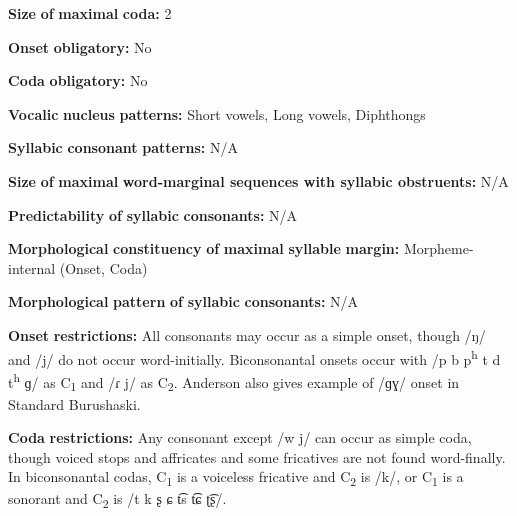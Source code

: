 \documentclass[output=paper]{langsci/langscibook}
\begin{document}
\begin{styleBody}
\textbf{Size} \textbf{of} \textbf{maximal} \textbf{coda:} 2
\end{styleBody}

\begin{styleBody}
\textbf{Onset} \textbf{obligatory:} No
\end{styleBody}

\begin{styleBody}
\textbf{Coda} \textbf{obligatory:} No
\end{styleBody}

\begin{styleBody}
\textbf{Vocalic} \textbf{nucleus} \textbf{patterns:} Short vowels, Long vowels, Diphthongs
\end{styleBody}

\begin{styleBody}
\textbf{Syllabic} \textbf{consonant} \textbf{patterns:} N/A
\end{styleBody}

\begin{styleBody}
\textbf{Size} \textbf{of} \textbf{maximal} \textbf{word{}-marginal sequences with syllabic obstruents:} N/A
\end{styleBody}

\begin{styleBody}
\textbf{Predictability} \textbf{of} \textbf{syllabic} \textbf{consonants:} N/A
\end{styleBody}

\begin{styleBody}
\textbf{Morphological} \textbf{constituency} \textbf{of} \textbf{maximal} \textbf{syllable} \textbf{margin:} Morpheme-internal (Onset, Coda)
\end{styleBody}

\begin{styleBody}
\textbf{Morphological} \textbf{pattern} \textbf{of} \textbf{syllabic} \textbf{consonants:} N/A
\end{styleBody}

\begin{styleBody}
\textbf{Onset} \textbf{restrictions:} All consonants may occur as a simple onset, though /ŋ/ and /j/ do not occur word-initially. Biconsonantal onsets occur with /p b p\textsuperscript{h} t d t\textsuperscript{h} ɡ/ as C\textsubscript{1} and /ɾ j/ as C\textsubscript{2}. Anderson also gives example of /ɡɣ/ onset in Standard Burushaski.
\end{styleBody}

\begin{styleBody}
\textbf{Coda} \textbf{restrictions:} Any consonant except /w j/ can occur as simple coda, though voiced stops and affricates and some fricatives are not found word-finally. In biconsonantal codas, C\textsubscript{1} is a voiceless fricative and C\textsubscript{2} is /k/, or C\textsubscript{1} is a sonorant and C\textsubscript{2} is /t k ʂ ɕ t͡s t͡ɕ ʈ͡ʂ/. 
\end{styleBody}
\end{document}
